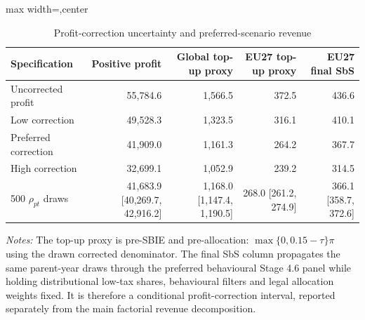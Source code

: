 \begin{table}[H]
\centering
\footnotesize
\setlength{\tabcolsep}{3pt}
\caption{Profit-correction uncertainty and preferred-scenario revenue}
\label{tab:profit_correction_revenue_sensitivity}
\begin{adjustbox}{max width=\textwidth,center}
\begin{tabular}{@{}lrrrr@{}}
\toprule
Specification & Positive profit & Global top-up proxy & EU27 top-up proxy & EU27 final SbS \\
\midrule
Uncorrected profit & 55,784.6 & 1,566.5 & 372.5 & 436.6 \\
Low correction & 49,528.3 & 1,323.5 & 316.1 & 410.1 \\
Preferred correction & 41,909.0 & 1,161.3 & 264.2 & 367.7 \\
High correction & 32,699.1 & 1,052.9 & 239.2 & 314.5 \\
500 $\rho_{pt}$ draws & 41,683.9 [40,269.7, 42,916.2] & 1,168.0 [1,147.4, 1,190.5] & 268.0 [261.2, 274.9] & 366.1 [358.7, 372.6] \\
\bottomrule
\end{tabular}
\end{adjustbox}

\vspace{0.35em}
\noindent\begin{minipage}{\textwidth}
\footnotesize\raggedright\textit{Notes:} The top-up proxy is pre-SBIE and pre-allocation: $\max\{0,0.15-\tau\}\pi$ using the drawn corrected denominator. The final SbS column propagates the same parent-year draws through the preferred behavioural Stage 4.6 panel while holding distributional low-tax shares, behavioural filters and legal allocation weights fixed. It is therefore a conditional profit-correction interval, reported separately from the main factorial revenue decomposition.
\end{minipage}
\end{table}
